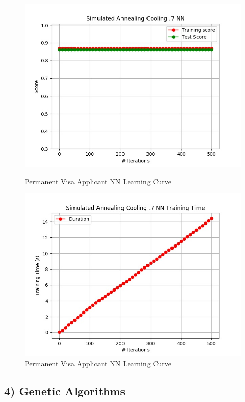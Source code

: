 \documentclass[h]{article}
\begin{document}
 \begin{figure}[H]
      \includegraphics[width=1\textwidth,keepaspectratio]{simulated_annealing_cooling_pt7_nn.jpg} 
      \caption*{Permanent Visa Applicant NN Learning Curve} 
   \endminipage\hfill
      \includegraphics[width=1\textwidth,keepaspectratio]{simulated_annealing_cooling_pt7_nn_time.jpg} 
      \caption*{Permanent Visa Applicant NN Learning Curve} 
   \endminipage\hfill
\end{figure}

\subsection*{4) Genetic Algorithms}  
\end{document}
